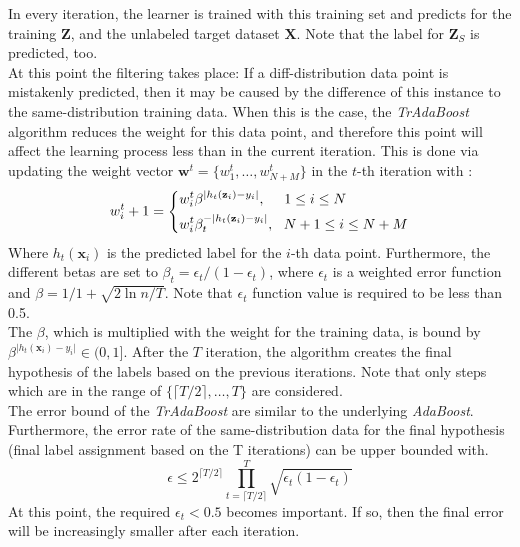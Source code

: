 In every iteration, the learner is trained with this training set and predicts for the training $\mathbf{Z}$, and the unlabeled target dataset $\mathbf{X}$.
Note that the label for $\mathbf{Z}_S$ is predicted, too.\cite{Dai.}\\
At this point the filtering takes place:
If a diff-distribution data point is mistakenly predicted, then it may be caused by the difference of this instance to the same-distribution training data.
When this is the case, the \textit{TrAdaBoost} algorithm reduces the weight for this data point, and therefore this point will affect the learning process less than in the current iteration.
This is done via updating the weight vector $\mathbf{w}^t=\{w_1^t,\dots,w_{N+M}^t\}$ in the $t$-th iteration with \cite{Dai.}:
\begin{equation}\label{EqTrAdaWeighting}
	w_i^t+1=\begin{dcases}
				w_i^t\beta^{\vert h_t(\mathbf{z}_i )-y_i\vert}, \>\>\>\>\>\> 1\le i \le N \\
				w_i^t\beta_t^{-\vert h_t(\mathbf{z}_i )-y_i\vert}, \>\>\> N+1\le i \le N+M
			 \end{dcases}
\end{equation}
Where $ h_t(\mathbf{x}_i )$ is the predicted label for the $i$-th data point.
Furthermore, the different betas are set to $\beta_t = \epsilon_t / (1-\epsilon_t)$, where $\epsilon_t$ is a weighted error function and $\beta= 1 / 1 + \sqrt{2\ln n/T}$.
Note that $\epsilon_t$ function value is required to be less than 0.5.\\
The $\beta$, which is multiplied with the weight for the training data, is bound by $\beta^{\vert h_t(\mathbf{x}_i )-y_i\vert} \in (0,1]$.
After the $T$ iteration, the algorithm creates the final hypothesis of the labels based on the previous iterations.
Note that only steps which are in the range of $\{\lceil T /2 \rceil,\dots,T\}$ are considered.\cite{Dai.}\\
The error bound of the \textit{TrAdaBoost} are similar to the underlying \textit{AdaBoost}.
Furthermore, the error rate of the same-distribution data for the final hypothesis (final label assignment based on the T iterations) can be upper bounded with.
\begin{equation}
	\epsilon \le 2^{\lceil T / 2\rceil} \prod_{t=\lceil T / 2\rceil}^{T} \sqrt{\epsilon_t(1-\epsilon_t)}
\end{equation}
At this point, the required $\epsilon_t < 0.5$ becomes important.
If so, then the final error will be increasingly smaller after each iteration.\cite{Dai.}

